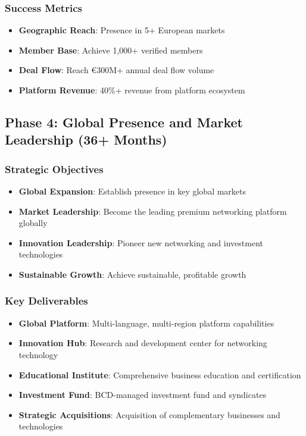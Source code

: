 \subsubsection{Success Metrics}
\begin{itemize}
    \item \textbf{Geographic Reach}: Presence in 5+ European markets
    \item \textbf{Member Base}: Achieve 1,000+ verified members
    \item \textbf{Deal Flow}: Reach €300M+ annual deal flow volume
    \item \textbf{Platform Revenue}: 40\%+ revenue from platform ecosystem
\end{itemize}

\subsection{Phase 4: Global Presence and Market Leadership (36+ Months)}

\subsubsection{Strategic Objectives}
\begin{itemize}
    \item \textbf{Global Expansion}: Establish presence in key global markets
    \item \textbf{Market Leadership}: Become the leading premium networking platform globally
    \item \textbf{Innovation Leadership}: Pioneer new networking and investment technologies
    \item \textbf{Sustainable Growth}: Achieve sustainable, profitable growth
\end{itemize}

\subsubsection{Key Deliverables}
\begin{itemize}
    \item \textbf{Global Platform}: Multi-language, multi-region platform capabilities
    \item \textbf{Innovation Hub}: Research and development center for networking technology
    \item \textbf{Educational Institute}: Comprehensive business education and certification
    \item \textbf{Investment Fund}: BCD-managed investment fund and syndicates
    \item \textbf{Strategic Acquisitions}: Acquisition of complementary businesses and technologies
\end{itemize}

